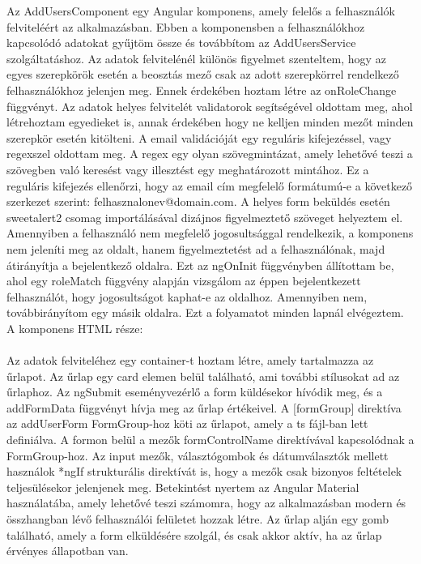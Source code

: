 Az AddUsersComponent egy Angular komponens, amely felelős a felhasználók felviteléért az alkalmazásban. Ebben a komponensben a felhasználókhoz kapcsolódó adatokat gyűjtöm össze és továbbítom az AddUsersService szolgáltatáshoz. Az adatok felvitelénél különös figyelmet szenteltem, hogy az egyes szerepkörök esetén a beosztás mező csak az adott szerepkörrel rendelkező felhasználókhoz jelenjen meg. Ennek érdekében hoztam létre az onRoleChange függvényt. Az adatok helyes felvitelét validatorok segítségével oldottam meg, ahol létrehoztam egyedieket is, annak érdekében hogy ne kelljen minden mezőt minden szerepkör esetén kitölteni. A email validációját egy reguláris kifejezéssel, vagy regexszel oldottam meg. A regex egy olyan szövegmintázat, amely lehetővé teszi a szövegben való keresést vagy illesztést egy meghatározott mintához. Ez a reguláris kifejezés ellenőrzi, hogy az email cím megfelelő formátumú-e a következő szerkezet szerint: felhasznalonev@domain.com. A helyes form beküldés esetén sweetalert2 csomag importálásával dizájnos figyelmeztető szöveget helyeztem el. Amennyiben a felhasználó nem megfelelő jogosultsággal rendelkezik, a komponens nem jeleníti meg az oldalt, hanem figyelmeztetést ad a felhasználónak, majd átirányítja a bejelentkező oldalra. Ezt az ngOnInit függvényben állítottam be, ahol egy roleMatch függvény alapján vizsgálom az éppen bejelentkezett felhasználót, hogy jogosultságot kaphat-e az oldalhoz. Amennyiben nem, továbbirányítom egy másik oldalra. Ezt a folyamatot minden lapnál elvégeztem.\\
\newpage
A komponens HTML része:\\
\\
Az adatok felviteléhez egy container-t hoztam létre, amely tartalmazza az űrlapot. Az űrlap egy card elemen belül található, ami további stílusokat ad az űrlaphoz. Az ngSubmit eseményvezérlő a form küldésekor hívódik meg, és a addFormData függvényt hívja meg az űrlap értékeivel. A [formGroup] direktíva az addUserForm FormGroup-hoz köti az űrlapot, amely a ts fájl-ban lett definiálva. A formon belül a mezők formControlName direktívával kapcsolódnak a FormGroup-hoz. Az input mezők, választógombok és dátumválasztók mellett használok *ngIf strukturális direktívát is, hogy a mezők csak bizonyos feltételek teljesülésekor jelenjenek meg. Betekintést nyertem az Angular Material használatába, amely lehetővé teszi számomra, hogy az alkalmazásban modern és összhangban lévő felhasználói felületet hozzak létre. Az űrlap alján egy gomb található, amely a form elküldésére szolgál, és csak akkor aktív, ha az űrlap érvényes állapotban van. 

